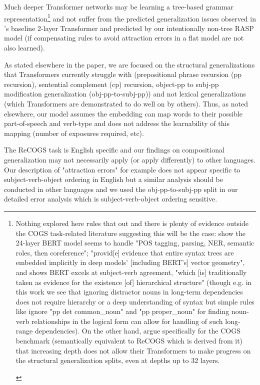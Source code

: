\documentclass[11pt]{article}
\begin{document}
Much deeper Transformer networks may be learning a tree-based grammar representation\footnote{\begin{footnotesize}Nothing explored here rules that out and there is plenty of evidence outside the COGS task-related literature suggesting this will be the case: \cite{tenney2019bertrediscoversclassicalnlp} show the 24-layer BERT model seems to handle "POS tagging, parsing, NER, semantic roles, then coreference"; \cite{hewitt-manning-2019-structural} "provid[e] evidence that entire syntax trees are embedded implicitly in deep models’ [including BERT's] vector geometry", and \cite{goldberg2019assessingbertssyntacticabilities} shows BERT excels at subject-verb agreement, "which [is] traditionally taken as evidence for
the existence [of] hierarchical structure" (though e.g. in this work we see that ignoring distractor nouns in long-term dependencies does not require hierarchy or a deep understanding of syntax but simple rules like ignore "pp det common\_noun" and "pp proper\_noun" for finding noun-verb relationships in the logical form can allow for handling of such long-range dependencies). On the other hand, \cite{petty2024impactdepthcompositionalgeneralization} argue specifically for the COGS benchmark (semantically equivalent to ReCOGS which is derived from it) that increasing depth does not allow their Transformers to make progress on the structural generalization splits, even at depths up to 32 layers.
\end{footnotesize}
} and not suffer from the predicted generalization issues observed in \cite{Wu2023}'s baseline 2-layer Transformer and predicted by our intentionally non-tree RASP model (if compensating rules to avoid attraction errors in a flat model are not also learned).

As stated elsewhere in the paper, we are focused on the structural generalizations that Transformers currently struggle with (prepositional phrase recursion (pp recursion), sentential complement (cp) recursion, object-pp to subj-pp modification generalization (obj-pp-to-subj-pp)) and not lexical generalizations (which Transformers are demonstrated to do well on by others). Thus, as noted elsewhere, our model assumes the embedding can map words to their possible part-of-speech and verb-type and does not address the learnability of this mapping (number of exposures required, etc).

The ReCOGS task is English specific and our findings on compositional generalization may not necessarily apply (or apply differently) to other languages. Our description of "attraction errors" for example does not appear specific to subject-verb-object ordering in English but a similar analysis should be conducted in other languages and we used the obj-pp-to-subj-pp split in our detailed error analysis which is subject-verb-object ordering sensitive.
\end{document}
